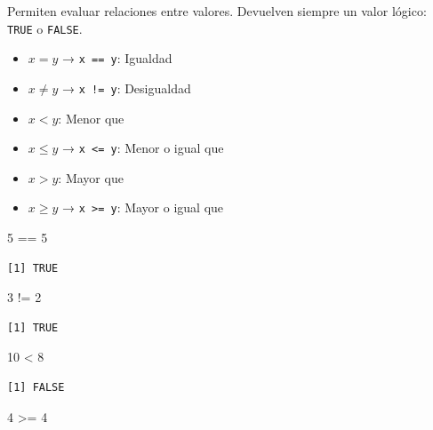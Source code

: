 \documentclass[
  letterpaper,
  DIV=11,
  numbers=noendperiod,
  twoside]{scrreprt}
\newenvironment{Shaded}{\begin{snugshade}}{\end{snugshade}}
\newcommand{\DecValTok}[1]{\textcolor[rgb]{0.68,0.00,0.00}{#1}}
\newcommand{\SpecialCharTok}[1]{\textcolor[rgb]{0.37,0.37,0.37}{#1}}
\providecommand{\tightlist}{%
  \setlength{\itemsep}{0pt}\setlength{\parskip}{0pt}}\usepackage{longtable,booktabs,array}
\begin{document}
Permiten evaluar relaciones entre valores. Devuelven siempre un valor
lógico: \texttt{TRUE} o \texttt{FALSE}.

\begin{itemize}
\tightlist
\item
  \(x = y\) → \texttt{x\ ==\ y}: Igualdad
\item
  \(x \neq y\) → \texttt{x\ !=\ y}: Desigualdad
\item
  \(x < y\): Menor que
\item
  \(x \leq y\) → \texttt{x\ \textless{}=\ y}: Menor o igual que
\item
  \(x > y\): Mayor que
\item
  \(x \geq y\) → \texttt{x\ \textgreater{}=\ y}: Mayor o igual que
\end{itemize}

\begin{Shaded}
\begin{Highlighting}[]
\DecValTok{5} \SpecialCharTok{==} \DecValTok{5}   
\end{Highlighting}
\end{Shaded}

\begin{verbatim}
[1] TRUE
\end{verbatim}

\begin{Shaded}
\begin{Highlighting}[]
\DecValTok{3} \SpecialCharTok{!=} \DecValTok{2}    
\end{Highlighting}
\end{Shaded}

\begin{verbatim}
[1] TRUE
\end{verbatim}

\begin{Shaded}
\begin{Highlighting}[]
\DecValTok{10} \SpecialCharTok{\textless{}} \DecValTok{8}    
\end{Highlighting}
\end{Shaded}

\begin{verbatim}
[1] FALSE
\end{verbatim}

\begin{Shaded}
\begin{Highlighting}[]
\DecValTok{4} \SpecialCharTok{\textgreater{}=} \DecValTok{4}     
\end{Highlighting}
\end{Shaded}
\end{document}
